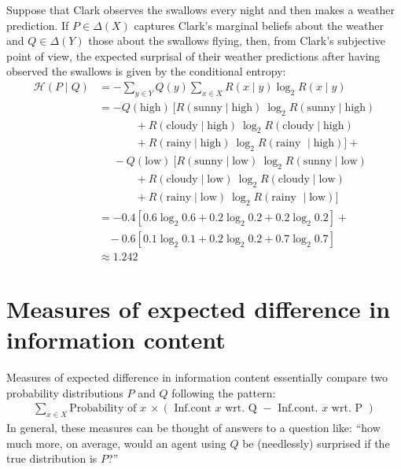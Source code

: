 \documentclass[nobib,nofonts]{tufte-handout}
\begin{document}
\begin{example}
  Suppose that Clark observes the swallows every night and then makes a weather prediction.
  If $P \in \Delta(X)$ captures Clark's marginal beliefs about the weather and $Q \in \Delta(Y)$ those about the swallows flying, then, from Clark's subjective point of view, the expected surprisal of their weather predictions after having observed the swallows is given by the conditional entropy:
  \begin{align*}
    \mathcal{H}(P \mid Q) & = - \sum_{y \in Y} Q(y)
                          \sum_{x \in X} R(x \mid y) \log_{2} R(x \mid y) \\
                          & = - Q(\text{high}) \ [ R(\text{sunny} \mid \text{high}) \ \log_{2} R(\text{sunny} \mid \text{high})  \\
                          & \ \ \ \ \ \ \ \ \ \ \ \ \ \ \ + R(\text{cloudy} \mid \text{high}) \ \log_{2} R(\text{cloudy} \mid \text{high}) \\
                          & \ \ \ \ \ \ \ \ \ \ \ \ \ \ \ + R(\text{rainy} \mid \text{high}) \ \log_{2} R(\text{rainy } \mid \text{high}) ] + \\
                           &\ \ \  \ \ \ - Q(\text{low}) \ [ R(\text{sunny} \mid \text{low}) \ \log_{2} R(\text{sunny} \mid \text{low})  \\
                          & \ \ \ \ \ \ \ \ \ \ \ \ \ \ \ + R(\text{cloudy} \mid \text{low}) \ \log_{2} R(\text{cloudy} \mid \text{low}) \\
                          & \ \ \ \ \ \ \ \ \ \ \ \ \ \ \ + R(\text{rainy} \mid \text{low}) \ \log_{2} R(\text{rainy } \mid \text{low}) ] \\
                          & = - 0.4 [0.6 \log_{2} 0.6 +  0.2 \log_{2} 0.2 + 0.2 \log_{2} 0.2] + \\
                          & \ \ \ \ - 0.6 [0.1 \log_{2} 0.1 +  0.2 \log_{2} 0.2 + 0.7 \log_{2} 0.7] \\
     & \approx 1.242
  \end{align*}
\end{example}

\section{Measures of expected difference in information content }
\label{sec:meas-expect-diff}

Measures of expected difference in information content essentially compare two probability distributions $P$ and $Q$ following the pattern:
\begin{align*}
  \sum_{x \in X} \text{Probability of } x \ \times (\text{ Inf.cont } x \text{ wrt. Q } - \text{ Inf.cont. } x \text{ wrt. P })
\end{align*}
In general, these measures can be thought of answers to a question like: ``how much more, on average, would an agent using $Q$ be (needlessly) surprised if the true distribution is $P$?''
\end{document}
